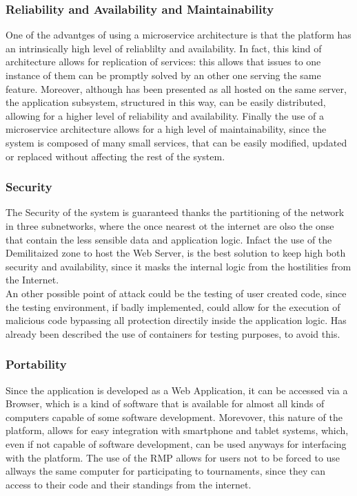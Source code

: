 \subsubsection{Reliability and Availability and Maintainability}
One of the advantges of using a microservice architecture is that the platform has an intrinsically high level of reliablilty and availability. 
In fact, this kind of architecture allows for replication of services: this allows that issues to one instance of them can be promptly solved by an other one serving the same feature. 
Moreover, although has been presented as all hosted on the same server, the application subsystem, structured in this way, can be easily distributed, allowing for a higher level of reliability and availability.
Finally the use of a microservice architecture allows for a high level of maintainability, since the system is composed of many small services, that can be easily modified, updated or replaced without affecting the rest of the system.\\
\subsubsection{Security}
The Security of the system is guaranteed thanks the partitioning of the network in three subnetworks, where the once nearest ot the internet are olso the onse that contain the less sensible data and application logic. Infact the use of the Demilitaized zone to host the Web Server, is the best solution to keep high both security and availability, since it masks the internal logic from the hostilities from the Internet.\\ 
An other possible point of attack could be the testing of user created code, since the testing environment, if badly implemented, could allow for the execution of malicious code bypassing all protection directily inside the application logic. 
Has already been described the use of containers for testing purposes, to avoid this.
\subsubsection{Portability}
Since the application is developed as a Web Application, it can be accessed via a Browser, which is a kind of software that is available for almost all kinds of computers capable of some software development. 
Morevover, this nature of the platform, allows for easy integration with smartphone and tablet systems, which, even if not capable of software development, can be used anyways for interfacing with the platform.
The use of the RMP allows for users not to be forced to use allways the same computer for participating to tournaments, since they can access to their code and their standings from the internet.